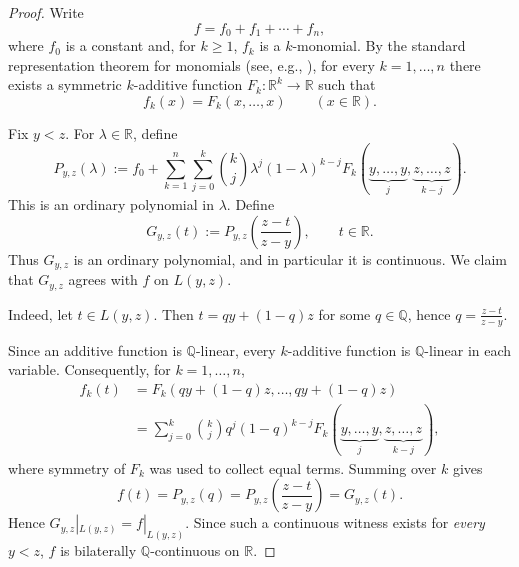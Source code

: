 \documentclass[11pt]{amsart} %
\theoremstyle{definition}
\begin{document}
\begin{proof}
Write
\begin{equation} 
    f=f_0+f_1+\cdots+f_n,
\end{equation} 
where $f_0$ is a constant and, for $k\geq1$, $f_k$ is a
$k$-monomial. By the standard representation theorem for monomials
(see, e.g., \cite[Theorem~15.9.2]{12}), for every
$k=1,\ldots,n$ there exists a symmetric $k$-additive function $F_k\colon\mathbb R^k\longrightarrow\mathbb R$
such that
\begin{equation} 
    f_k(x)=F_k(x,\ldots,x)
    \qquad(x\in\mathbb R).
\end{equation} 

Fix $y<z$. For $\lambda\in\mathbb R$, define
\begin{equation} 
    P_{y,z}(\lambda)
    :=
    f_0+
    \sum_{k=1}^n
    \sum_{j=0}^k
    \binom{k}{j}
    \lambda^j(1-\lambda)^{k-j}
    F_k(
       \underbrace{y,\ldots,y}_{j},
       \underbrace{z,\ldots,z}_{k-j}
    ).
\end{equation} 
This is an ordinary polynomial in $\lambda$. Define
\begin{equation} 
    G_{y,z}(t)
    :=
    P_{y,z}\left(\frac{z-t}{z-y}\right),
    \qquad t\in\mathbb R.
\end{equation} 
Thus $G_{y,z}$ is an ordinary polynomial, and in particular it is
continuous. We claim that $G_{y,z}$ agrees with $f$ on $L(y,z)$. 

Indeed, let
$t\in L(y,z)$. Then $t=qy+(1-q)z$
for some $q\in\mathbb Q$, hence $q=\frac{z-t}{z-y}.$ 

Since an additive function is $\mathbb Q$-linear, every
$k$-additive function is $\mathbb Q$-linear in each variable.
Consequently, for $k=1,\ldots,n$,
\begin{align*}
    f_k(t)
    &=
    F_k(qy+(1-q)z,\ldots,qy+(1-q)z)\\
    &=
    \sum_{j=0}^k
    \binom{k}{j}
    q^j(1-q)^{k-j}
    F_k(
       \underbrace{y,\ldots,y}_{j},
       \underbrace{z,\ldots,z}_{k-j}
    ),
\end{align*}
where symmetry of $F_k$ was used to collect equal terms. Summing over
$k$ gives
\begin{equation} 
    f(t)=P_{y,z}(q)
        =P_{y,z}\left(\frac{z-t}{z-y}\right)
        =G_{y,z}(t).
\end{equation} 
Hence $
    G_{y,z}|_{L(y,z)}=f|_{L(y,z)}.$ Since such a continuous witness exists for \emph{every} $y<z$, $f$ is bilaterally $\mathbb Q$-continuous
on $\mathbb R$.
\end{proof}
\end{document}
